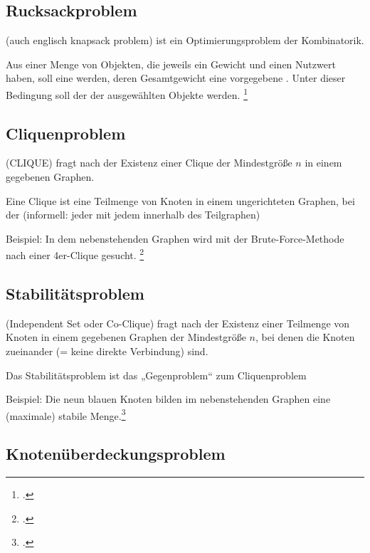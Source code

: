 \documentclass{lehramt-informatik-haupt}
\begin{document}
%

\subsection{Rucksackproblem}

(auch englisch knapsack problem) ist ein Optimierungsproblem der
Kombinatorik.

Aus einer Menge von Objekten, die jeweils ein Gewicht und einen Nutzwert
haben, soll eine  werden, deren
Gesamtgewicht eine vorgegebene . Unter dieser Bedingung soll der  der
ausgewählten Objekte  werden.
\footcite[Seite 75]{theo:fs:4}

%

\subsection{Cliquenproblem}

(CLIQUE) fragt nach der Existenz einer Clique der Mindestgröße $n$ in
einem gegebenen Graphen.

Eine Clique ist eine Teilmenge von Knoten in einem ungerichteten
Graphen, bei der 
(informell: jeder mit jedem innerhalb des Teilgraphen)

Beispiel: In dem nebenstehenden Graphen wird mit der Brute-Force-Methode
nach einer 4er-Clique gesucht.
\footcite[Seite 76]{theo:fs:4}

%

\subsection{Stabilitätsproblem}

(Independent Set oder Co-Clique) fragt nach der Existenz einer Teilmenge
von Knoten in einem gegebenen Graphen der Mindestgröße $n$, bei denen
die Knoten zueinander  (= keine direkte
Verbindung) sind.

Das Stabilitätsproblem ist das „Gegenproblem“ zum Cliquenproblem

Beispiel: Die neun blauen Knoten bilden im nebenstehenden Graphen eine
(maximale) stabile Menge.\footcite[Seite 77]{theo:fs:4}

%

\subsection{Knotenüberdeckungsproblem}
\end{document}

